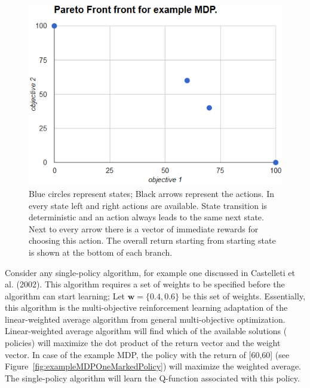 \begin{figure}[ht]
\centering
\includegraphics[scale=0.6]{exampleMDPFront.png}
\caption{Blue circles represent states; Black arrows represent the actions. In every state left and right actions are available. State transition is deterministic and an action always leads to the same next state. Next to every arrow there is a vector of immediate rewards for choosing this action. The overall return starting from starting state is shown at the bottom of each branch.}
\label{fig:exampleMDPFront}
\end{figure}

Consider any single-policy algorithm, for example one discussed in Castelleti et al. (2002)\nocite{castelletti2002reinforcement}. This algorithm requires a set of weights to be specified before the algorithm can start learning; Let $ \textbf{w} = \{0.4,0.6\} $ be this set of weights. Essentially, this algorithm is the multi-objective reinforcement learning adaptation of the linear-weighted average algorithm from general multi-objective optimization. Linear-weighted average algorithm will find which of the available solutions ( policies) will maximize the dot product of the return vector and the weight vector. In case of the example MDP, the policy with the return of [60,60] (see Figure~\ref{fig:exampleMDPOneMarkedPolicy}) will maximize the weighted average. The single-policy algorithm will learn the Q-function associated with this policy.

